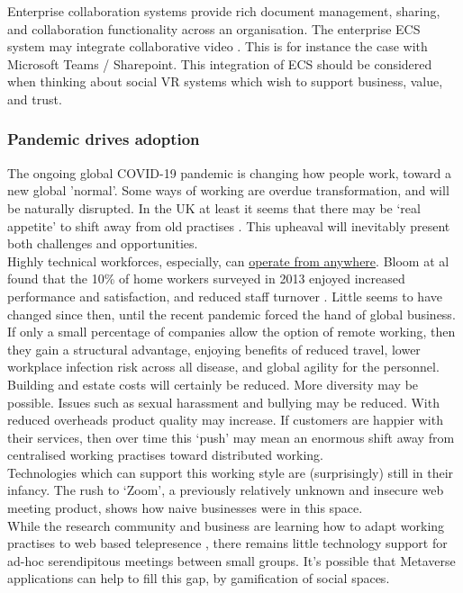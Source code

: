 Enterprise collaboration systems provide rich document management, sharing, and collaboration functionality across an organisation. The enterprise ECS system may integrate collaborative video \cite{prakash2020characteristic}. This is for instance the case with Microsoft Teams / Sharepoint. This integration of ECS should be considered when thinking about social VR systems which wish to support business, value, and trust.\\
\subsubsection{Pandemic drives adoption}
The ongoing global COVID-19 pandemic is changing how people work, toward a new global 'normal'. Some ways of working are overdue transformation, and will be naturally disrupted. In the UK at least it seems that there may be `real appetite' to shift away from old practises \cite{skychange}. This upheaval will inevitably present both challenges and opportunities.\\
Highly technical workforces, especially, can \href{https://globalworkplaceanalytics.com/telecommuting-statistics}{operate from anywhere}. Bloom at al found that the 10\% of home workers surveyed in 2013 enjoyed increased performance and satisfaction, and reduced staff turnover \cite{Bloom2015}. Little seems to have changed since then, until the recent pandemic forced the hand of global business. If only a small percentage of companies allow the option of remote working, then they gain a structural advantage, enjoying benefits of reduced travel, lower workplace infection risk across all disease, and global agility for the personnel. Building and estate costs will certainly be reduced. More diversity may be possible. Issues such as sexual harassment and bullying may be reduced.  With reduced overheads product quality may increase. If customers are happier with their services, then over time this `push' may mean an enormous shift away from centralised working practises toward distributed working. \\
Technologies which can support this working style are (surprisingly) still in their infancy. The rush to `Zoom', a previously relatively unknown and insecure \cite{aiken2020zooming} web meeting product, shows how naive businesses were in this space. \\
While the research community and business are learning how to adapt working practises to web based telepresence \cite{oeppen2020human}, there remains little technology support for ad-hoc serendipitous meetings between small groups. It's possible that Metaverse applications can help to fill this gap, by gamification of social spaces.\\


